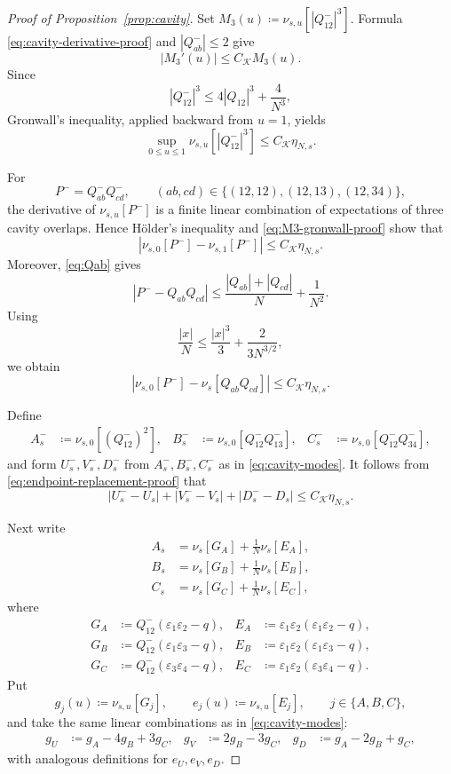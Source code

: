 \documentclass[11pt]{article}
\numberwithin{equation}{section}
\newcommand{\1}{\mathbf 1}
\newcommand{\cK}{\mathcal K}
\begin{document}
\begin{proof}[Proof of Proposition~\ref{prop:cavity}]
Set $M_3(u)\coloneqq\nu_{s,u}[|Q^-_{12}|^3]$.  Formula
\eqref{eq:cavity-derivative-proof} and $|Q^-_{ab}|\le2$ give
\[
 |M_3'(u)|\le C_{\cK}M_3(u).
\]
Since
\[
 |Q^-_{12}|^3\le4|Q_{12}|^3+\frac4{N^3},
\]
Gronwall's inequality, applied backward from $u=1$, yields
\begin{equation}
 \sup_{0\le u\le1}\nu_{s,u}[|Q^-_{12}|^3]
 \le C_{\cK}\eta_{N,s}.
 \label{eq:M3-gronwall-proof}
\end{equation}

For
\[
 P^-=Q^-_{ab}Q^-_{cd},
 \qquad (ab,cd)\in\{(12,12),(12,13),(12,34)\},
\]
the derivative of $\nu_{s,u}[P^-]$ is a finite linear combination of
expectations of three cavity overlaps.  Hence H\"older's inequality and
\eqref{eq:M3-gronwall-proof} show that
\[
 |\nu_{s,0}[P^-]-\nu_{s,1}[P^-]|
 \le C_{\cK}\eta_{N,s}.
\]
Moreover, \eqref{eq:Qab} gives
\[
 |P^--Q_{ab}Q_{cd}|
 \le\frac{|Q_{ab}|+|Q_{cd}|}{N}+\frac1{N^2}.
\]
Using
\[
 \frac{|x|}{N}\le\frac{|x|^3}{3}+\frac{2}{3N^{3/2}},
\]
we obtain
\begin{equation}
 \left|\nu_{s,0}[P^-]-\nu_s[Q_{ab}Q_{cd}]\right|
 \le C_{\cK}\eta_{N,s}.
 \label{eq:endpoint-replacement-proof}
\end{equation}

Define
\begin{align*}
 A_s^-&\coloneqq\nu_{s,0}[(Q^-_{12})^2],&
 B_s^-&\coloneqq\nu_{s,0}[Q^-_{12}Q^-_{13}],&
 C_s^-&\coloneqq\nu_{s,0}[Q^-_{12}Q^-_{34}],
\end{align*}
and form $U_s^-,V_s^-,D_s^-$ from $A_s^-,B_s^-,C_s^-$ as in
\eqref{eq:cavity-modes}.  It follows from
\eqref{eq:endpoint-replacement-proof} that
\begin{equation}
 |U_s^--U_s|+|V_s^--V_s|+|D_s^--D_s|
 \le C_{\cK}\eta_{N,s}.
 \label{eq:cavity-mode-replacement}
\end{equation}

Next write
\begin{align}
 A_s&=\nu_s[G_A]+\frac1N\nu_s[E_A],\nonumber\\
 B_s&=\nu_s[G_B]+\frac1N\nu_s[E_B],\nonumber\\
 C_s&=\nu_s[G_C]+\frac1N\nu_s[E_C],
 \label{eq:cavity-decomposition-proof}
\end{align}
where
\begin{align*}
 G_A&\coloneqq Q^-_{12}(\varepsilon_1\varepsilon_2-q),&
 E_A&\coloneqq\varepsilon_1\varepsilon_2
 (\varepsilon_1\varepsilon_2-q),\\
 G_B&\coloneqq Q^-_{12}(\varepsilon_1\varepsilon_3-q),&
 E_B&\coloneqq\varepsilon_1\varepsilon_2
 (\varepsilon_1\varepsilon_3-q),\\
 G_C&\coloneqq Q^-_{12}(\varepsilon_3\varepsilon_4-q),&
 E_C&\coloneqq\varepsilon_1\varepsilon_2
 (\varepsilon_3\varepsilon_4-q).
\end{align*}
Put
\[
 g_j(u)\coloneqq\nu_{s,u}[G_j],
 \qquad
 e_j(u)\coloneqq\nu_{s,u}[E_j],
 \qquad j\in\{A,B,C\},
\]
and take the same linear combinations as in \eqref{eq:cavity-modes}:
\begin{align*}
 g_U&\coloneqq g_A-4g_B+3g_C,&
 g_V&\coloneqq2g_B-3g_C,&
 g_D&\coloneqq g_A-2g_B+g_C,
\end{align*}
with analogous definitions for $e_U,e_V,e_D$.


\end{proof}
\end{document}
